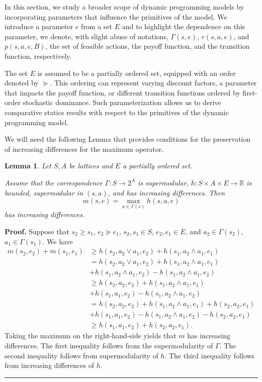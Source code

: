 \documentclass[letter,11pt]{article}
\newtheorem{lemma}{Lemma}[section]
\newenvironment {proof}[1][Proof]{\noindent \textbf {#1.} }{\ \rule {0.5em}{0.5em}}
\begin{document}
In this section, we study a broader scope of dynamic programming models by incorporating parameters that influence the primitives of the model. We introduce a parameter \( e \) from a set \( E \) and to highlight the dependence on this parameter, we denote, with slight abuse of notations, \( \Gamma(s,e) \), \( r(s,a,e) \), and \( p(s,a,e,B) \), the set of feasible actions, the payoff function, and the transition function, respectively. 

The set \( E \) is assumed to be a partially ordered set, equipped with an order denoted by \( \succeq \). This ordering can represent  varying discount factors, a parameter that impacts the payoff function, or different transition functions ordered by first-order stochastic dominance. Such parameterization allows us to derive comparative statics results with respect to the primitives of the dynamic programming model.

We will need the following Lemma that provides conditions for the preservation of increasing differences for the maximum operator. 
\begin{lemma} \label{Lemma:Increasing_d}
   Let $S,A$ be lattices and $E$ a partially ordered set.
   
   Assume that the correspondence  $\Gamma:S \rightarrow 2^{A}$ is supermodular, $h:S \times A \times E \rightarrow \mathbb{R}$ is bounded, supermodular in $(s,a)$, and has increasing differences. Then 
   $$ m(s,e ) = \max _{a \in \Gamma(s)} h(s,a,e)$$
   has increasing differences. 
\end{lemma}

\begin{proof}
  Suppose that $s_{2} \geq s_{1} $,  $e_{2} \succeq e_{1}$, $s_{2},s_{1} \in S$, $e_{2},e_{1} \in E$, and $a_{2} \in \Gamma(s_{2})$, $a_{1} \in \Gamma(s_{1})$. We have
    \begin{align*}
        m(s_{2},e_{2}) + m(s_{1},e_{1}) & \geq h(s_{2},a_{2} \lor a_{1}, e_{2}) + h(s_{1},a_{2} \land  a_{1}, e_{1}) \\
        & = h(s_{2},a_{2} \lor a_{1}, e_{2}) + h(s_{1},a_{2} \land  a_{1}, e_{1}) \\
        & + h(s_{1},a_{2} \land a_{1}, e_{2}) - h(s_{1},a_{2} \land  a_{1}, e_{2}) \\
        & \geq  h(s_{2},a_{2} , e_{2}) + h(s_{1},a_{2} \land  a_{1}, e_{1}) \\
        & + h(s_{1}, a_{1}, e_{2}) - h(s_{1},a_{2} \land  a_{1}, e_{2}) \\
        & =  h(s_{2},a_{2} , e_{2}) + h(s_{1},a_{2} \land  a_{1}, e_{1}) + h(s_{2},a_{2},e_{1}) \\
        & + h(s_{1}, a_{1}, e_{2}) - h(s_{1},a_{2} \land  a_{1}, e_{2}) - h(s_{2},a_{2},e_{1}) \\ 
        & \geq  h(s_{1},a_{1},e_{2}) + h(s_{2},a_{2},e_{1}). 
    \end{align*}
    Taking the maximum on the right-hand-side yields that $m$ has increasing differences. The first inequality follows from the supermodularity of $\Gamma$. The second inequality follows from supermodularity of $h$. The third inequality follows from increasing differences of $h$. 
\end{proof}
\end{document}
